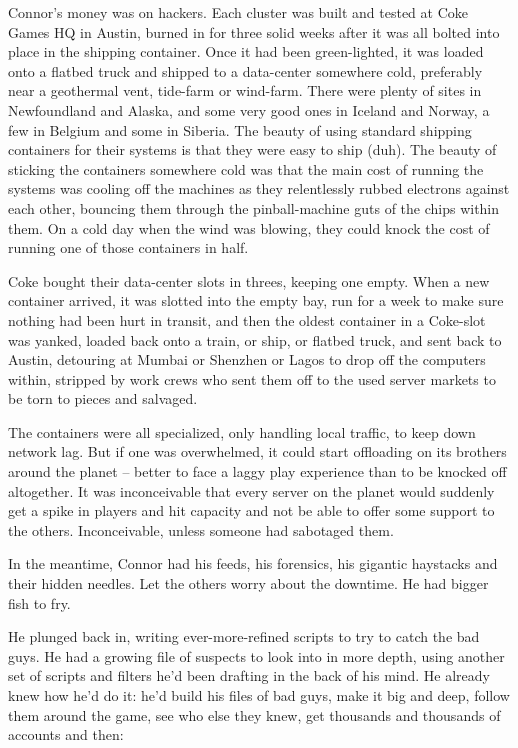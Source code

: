 Connor's money was on hackers. Each cluster was built and tested at
Coke Games HQ in Austin, burned in for three solid weeks after it
was all bolted into place in the shipping container. Once it had
been green-lighted, it was loaded onto a flatbed truck and shipped
to a data-center somewhere cold, preferably near a geothermal vent,
tide-farm or wind-farm. There were plenty of sites in Newfoundland
and Alaska, and some very good ones in Iceland and Norway, a few in
Belgium and some in Siberia. The beauty of using standard shipping
containers for their systems is that they were easy to ship (duh).
The beauty of sticking the containers somewhere cold was that the
main cost of running the systems was cooling off the machines as
they relentlessly rubbed electrons against each other, bouncing
them through the pinball-machine guts of the chips within them. On
a cold day when the wind was blowing, they could knock the cost of
running one of those containers in half.

Coke bought their data-center slots in threes, keeping one empty.
When a new container arrived, it was slotted into the empty bay,
run for a week to make sure nothing had been hurt in transit, and
then the oldest container in a Coke-slot was yanked, loaded back
onto a train, or ship, or flatbed truck, and sent back to Austin,
detouring at Mumbai or Shenzhen or Lagos to drop off the computers
within, stripped by work crews who sent them off to the used server
markets to be torn to pieces and salvaged.

The containers were all specialized, only handling local traffic,
to keep down network lag. But if one was overwhelmed, it could
start offloading on its brothers around the planet -- better to
face a laggy play experience than to be knocked off altogether. It
was inconceivable that every server on the planet would suddenly
get a spike in players and hit capacity and not be able to offer
some support to the others. Inconceivable, unless someone had
sabotaged them.

In the meantime, Connor had his feeds, his forensics, his gigantic
haystacks and their hidden needles. Let the others worry about the
downtime. He had bigger fish to fry.

He plunged back in, writing ever-more-refined scripts to try to
catch the bad guys. He had a growing file of suspects to look into
in more depth, using another set of scripts and filters he'd been
drafting in the back of his mind. He already knew how he'd do it:
he'd build his files of bad guys, make it big and deep, follow them
around the game, see who else they knew, get thousands and
thousands of accounts and then:

